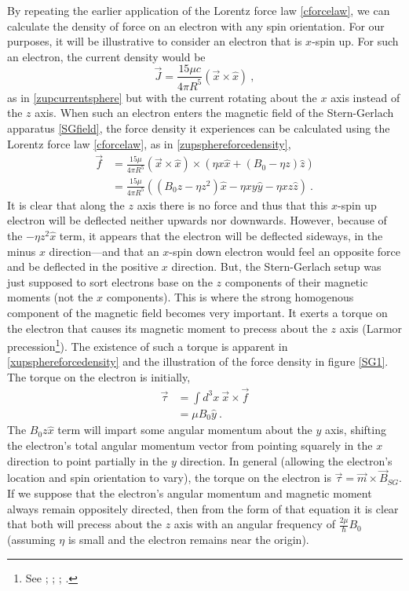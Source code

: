 \documentclass[onecolumn,secnumarabic,amsmath,amssymb,balancelastpage,nofootinbib]{article}
\begin{document}
By repeating the earlier application of the Lorentz force law \eqref{cforcelaw}, we can calculate the density of force on an electron with any spin orientation.  For our purposes, it will be illustrative to consider an electron that is $x$-spin up.  For such an electron, the current density would be
\begin{equation}
\vec{J}=\frac{15 \mu c}{4 \pi R^5} ( \vec{x}\times \hat{x} )
\ ,
\label{xupcurrentsphere}
\end{equation}
as in \eqref{zupcurrentsphere} but with the current rotating about the $x$ axis instead of the $z$ axis.  When such an electron enters the magnetic field of the Stern-Gerlach apparatus \eqref{SGfield}, the force density it experiences can be calculated using the Lorentz force law \eqref{cforcelaw}, as in \eqref{zupsphereforcedensity},
\begin{align}
\vec{f}&=\frac{15 \mu}{4 \pi R^5} (\vec{x}\times\hat{x})\times(\eta x \hat{x} +(B_0 - \eta z)\hat{z})
\nonumber
\\
&=\frac{15 \mu}{4 \pi R^5} \left( (B_0 z - \eta z^2) \hat{x} - \eta x y \hat{y} - \eta x z \hat{z} \right)
\ .
\label{xupsphereforcedensity}
\end{align}
It is clear that along the $z$ axis there is no force and thus that this $x$-spin up electron will be deflected neither upwards nor downwards.  However, because of the  $- \eta z^2 \hat{x}$ term, it appears that the electron will be deflected sideways, in the minus $x$ direction---and that an $x$-spin down electron would feel an opposite force and be deflected in the positive $x$ direction.  But, the Stern-Gerlach setup was just supposed to sort electrons base on the $z$ components of their magnetic moments (not the $x$ components).  This is where the strong homogenous component of the magnetic field becomes very important.  It exerts a torque on the electron that causes its magnetic moment to precess about the $z$ axis (Larmor precession\footnote{See \citet[sec.\ 34.3]{feynman2}; \citet[sec.\ 45]{landaulifshitzfields}; \citet{alstrom1982}; \citet[sec.\ 4.4.2]{griffithsQM}.}).  The existence of such a torque is apparent in \eqref{xupsphereforcedensity} and the illustration of the force density in figure \ref{SG1}.  The torque on the electron is initially,
\begin{align}
\vec{\tau}&=\int d^3 x \ \vec{x} \times \vec{f}
\nonumber
\\
&=\mu B_0 \hat{y}
\ .
\label{xupspheretorque}
\end{align}
The $B_0 z \hat{x}$ term will impart some angular momentum about the $y$ axis, shifting the electron's total angular momentum vector from pointing squarely in the $x$ direction to point partially in the $y$ direction.  In general (allowing the electron's location and spin orientation to vary), the torque on the electron is $\vec{\tau}= \vec{m}\times\vec{B}_{SG}$.  If we suppose that the electron's angular momentum and magnetic moment always remain oppositely directed, then from the form of that equation it is clear that both will precess about the $z$ axis with an angular frequency of $\frac{2\mu}{\hbar} B_0$ (assuming $\eta$ is small and the electron remains near the origin).
\end{document}
